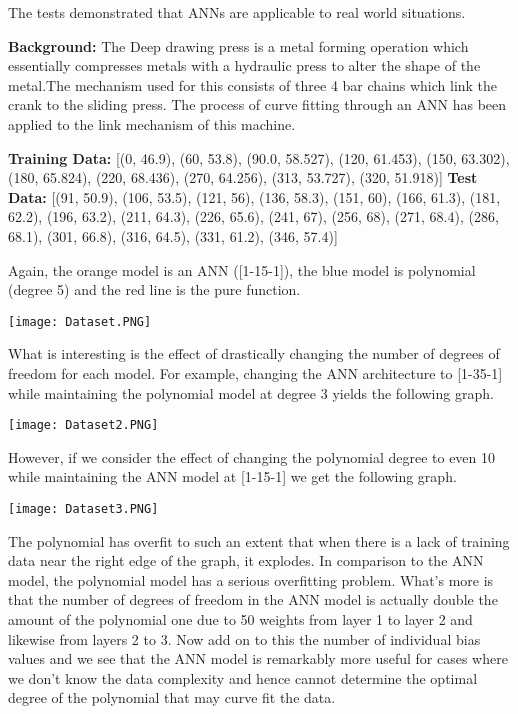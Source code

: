 \documentclass{article}
\begin{document}
The tests demonstrated that ANNs are applicable to real world situations.


\textbf{Background:}
The Deep drawing press is a metal forming operation which essentially compresses metals with a hydraulic press to alter the shape of the metal.The mechanism used for this consists of three 4 bar chains which link the crank to the sliding press. The process of curve fitting through an ANN has been applied to the link mechanism of this machine.

\textbf{Training Data:} [(0, 46.9), (60, 53.8), (90.0, 58.527), (120, 61.453), (150, 63.302), (180, 65.824), (220, 68.436), (270, 64.256), (313, 53.727), (320, 51.918)]
\newline
\newline
\textbf{Test Data:} [(91, 50.9), (106, 53.5), (121, 56), (136, 58.3), (151, 60), (166, 61.3), (181, 62.2), (196, 63.2), (211, 64.3), (226, 65.6), (241, 67), (256, 68), (271, 68.4), (286, 68.1), (301, 66.8), (316, 64.5), (331, 61.2), (346, 57.4)]

Again, the orange model is an ANN ([1-15-1]), the blue model is polynomial (degree 5) and the red line is the pure function.

\begin{center}
    \texttt{[image: Dataset.PNG]}
\end{center}

What is interesting is the effect of drastically changing the number of degrees of freedom for each model. For example, changing the ANN architecture to [1-35-1] while maintaining the polynomial model at degree 3 yields the following graph.

\begin{center}
    \texttt{[image: Dataset2.PNG]}
\end{center}

However, if we consider the effect of changing the polynomial degree to even 10 while maintaining the ANN model at [1-15-1] we get the following graph.

\begin{center}
    \texttt{[image: Dataset3.PNG]}
\end{center}

The polynomial has overfit to such an extent that when there is a lack of training data near the right edge of the graph, it explodes. In comparison to the ANN model, the polynomial model has a serious overfitting problem. What's more is that the number of degrees of freedom in the ANN model is actually double the amount of the polynomial one due to 50 weights from layer 1 to layer 2 and likewise from layers 2 to 3. Now add on to this the number of individual bias values and we see that the ANN model is remarkably more useful for cases where we don't know the data complexity and hence cannot determine the optimal degree of the polynomial that may curve fit the data.
\end{document}
